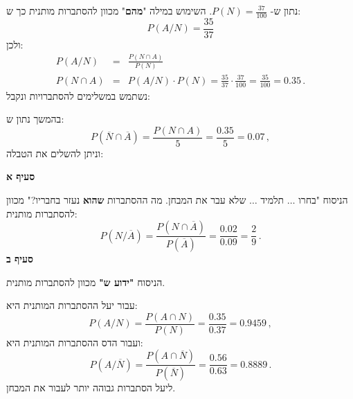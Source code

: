 נתון ש-%
$P(N)=\frac{37}{100}$.
השימוש במילה
"\textbf{מהם}"
מכוון להסתברות מותנית כך ש:
\[
P(A/N)=\frac{35}{37}
\]
ולכן:
\begin{eqnarray*}
P(A/N) &=& \frac{P(N\cap A)}{P(N)}\\
P(N\cap A) &=& P(A/N)\cdot P(N) = \frac{35}{37}\cdot \frac{37}{100} = \frac{35}{100} = 0.35\,.
\end{eqnarray*}
נשתמש במשלימים להסתברויות ונקבל:
\begin{center}
\end{center}



בהמשך נתון ש:
\[
P(\overline{N}\cap\overline{A})=\frac{P(N\cap A)}{5}=\frac{0.35}{5}=0.07\,,
\]
וניתן להשלים את הטבלה:
\begin{center}
\end{center}

\smallskip

\textbf{סעיף א}

הניסוח "בחרו 
$\ldots$
תלמיד 
$\ldots$
שלא עבר את המבחן. מה ההסתברות
\textbf{שהוא}
נעזר בחבריו?" מכוון להסתברות מותנית:
\[
P(N/\overline{A})=\frac{P(N\cap \overline{A})}{P(\overline{A})}=\frac{0.02}{0.09}=\frac{2}{9}\,.
\]
\textbf{סעיף ב}

הניסוח
\textbf{"ידוע ש"}
מכוון להסתברות מותנית.

עבור יעל ההסתברות המותנית היא:
\[
P(A/N)=\frac{P(A \cap N)}{P(N)}=\frac{0.35}{0.37}=0.9459\,,
\]
ועבור הדס ההסתברות המותנית היא:
\[
P(A/\overline{N})=\frac{P(A\cap \overline{N})}{P(\overline{N})}=\frac{0.56}{0.63}=0.8889\,.
\]
ליעל הסתברות גבוהה יותר לעבור את המבחן.

